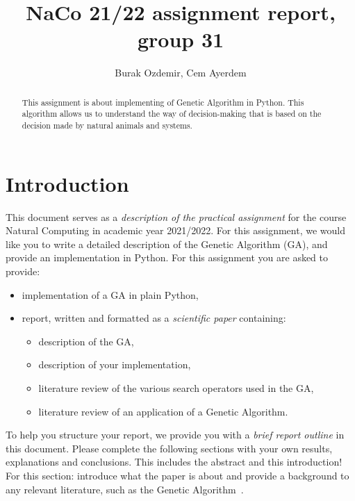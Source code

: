 \documentclass[runningheads]{llncs}
\begin{document}
%
\title{NaCo 21/22 assignment report, group 31}
%
%
\author{Burak Ozdemir, Cem Ayerdem}
%
%
%
\maketitle %
%

\begin{abstract}
This assignment is about implementing of Genetic Algorithm in Python. This algorithm allows us to understand the way of decision-making that is based on the decision made by natural animals and systems.  
\end{abstract}

\section{Introduction}
This document serves as a \textit{description of the practical assignment} for the course Natural Computing in academic year 2021/2022. 
For this assignment, we would like you to write a detailed description of the Genetic Algorithm (GA), and provide an implementation in Python. For this assignment you are asked to provide:
\begin{itemize}
    \item implementation of a GA in plain Python,
    \item report, written and formatted as a \textit{scientific paper} containing:
    \begin{itemize}
        \item description of the GA,
        \item description of your implementation,
        \item literature review of the various search operators used in the GA,
        \item literature review of an application of a Genetic Algorithm.
    \end{itemize}
\end{itemize}

To help you structure your report, we provide you with a \textit{brief report outline} in this document. Please complete the following sections with your own results, explanations and conclusions. This includes the abstract and this introduction! For this section: introduce what the paper is about and provide a background to any relevant literature, such as the Genetic Algorithm~\cite{Holland1975}. 
\end{document}
